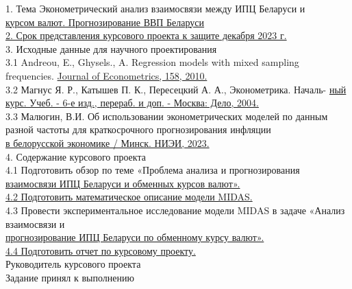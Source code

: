 \documentclass[a4paper, 14pt]{extarticle}
\begin{document}
	1. Тема \hspace{3mm} Эконометрический анализ взаимосвязи между ИПЦ Беларуси и\\
	\hspace*{22mm}\underline{курсом валют. Прогнозирование ВВП Беларуси\hspace*{\linegoal}}\\[2mm]
	\underline{2. Срок представления курсового проекта к защите  \quad {} декабря 2023 г.\hspace*{\linegoal}}\\[2mm]
	3. Исходные данные для научного проектирования\\[2mm]
	3.1 Andreou, E., Ghysels., A. Regression models with mixed sampling frequencies.
	\underline{Journal of Econometrics, 158, 2010.\hspace*{\linegoal}}\\[2mm]
	3.2 Магнус Я. Р., Катышев П. К., Пересецкий А. А., Эконометрика. Началь-
	\underline{ный курс. Учеб. - 6-е изд., перераб. и доп. - Москва: Дело, 2004.\hspace*{\linegoal}} \\[2mm]
	3.3 Малюгин, В.И. Об использовании эконометрических моделей по данным разной частоты для краткосрочного прогнозирования инфляции\\
	\underline{в белорусской экономике / Минск. НИЭИ, 2023.\hspace*{\linegoal}}\\[2mm]
	4. Содержание курсового проекта\\[2mm]
	4.1 Подготовить обзор по теме «Проблема анализа и прогнозирования \\
	\underline{взаимосвязи ИПЦ Беларуси и обменных курсов валют».\hspace*{\linegoal}}\\[2mm]
	\underline{4.2 Подготовить математическое описание модели MIDAS.\hspace*{\linegoal}}\\[2mm]
	4.3 Провести экспериментальное исследование модели MIDAS в задаче «Анализ взаимосвязи и\\
	\underline{прогнозирование ИПЦ Беларуси по обменному курсу валют».\hspace*{\linegoal}}\\[2mm]
	\underline{4.4 Подготовить отчет по курсовому проекту.\hspace*{\linegoal}}\\[2mm]
	\vfill
	\noindent Руководитель курсового проекта \\[2mm]
	Задание принял к выполнению \hspace*{4mm} \\[2mm]
	\newpage
	\tableofcontents
	\newpage
\end{document}
